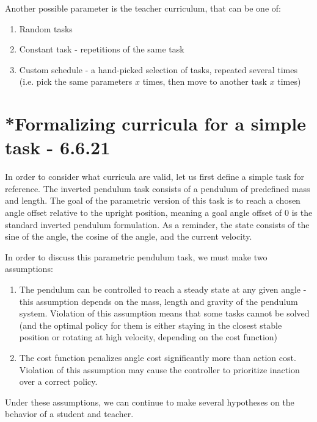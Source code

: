 \documentclass[letterpaper]{article}
\theoremstyle{definition}
\begin{document}
Another possible parameter is the teacher curriculum, that can be one of:
\begin{enumerate}
	\item Random tasks
	\item Constant task - repetitions of the same task
	\item Custom schedule - a hand-picked selection of tasks, repeated several times (i.e. pick the same parameters $x$ times, then move to another task $x$ times) 
\end{enumerate}

\section{*Formalizing curricula for a simple task - 6.6.21} \label{sec:pendulum-dreams}

In order to consider what curricula are valid, let us first define a simple task for reference.
The inverted pendulum task consists of a pendulum of predefined mass and length.
The goal of the parametric version of this task is to reach a chosen angle offset relative to the upright position, meaning a goal angle offset of 0 is the standard inverted pendulum formulation.
As a reminder, the state consists of the sine of the angle, the cosine of the angle, and the current velocity.

In order to discuss this parametric pendulum task, we must make two assumptions:
\begin{enumerate}
	\item The pendulum can be controlled to reach a steady state at any given angle - this assumption depends on the mass, length and gravity of the pendulum system. Violation of this assumption means that some tasks cannot be solved (and the optimal policy for them is either staying in the closest stable position or rotating at high velocity, depending on the cost function)
	\item The cost function penalizes angle cost significantly more than action cost. Violation of this assumption may cause the controller to prioritize inaction over a correct policy.
\end{enumerate}
Under these assumptions, we can continue to make several hypotheses on the behavior of a student and teacher.
\end{document}
